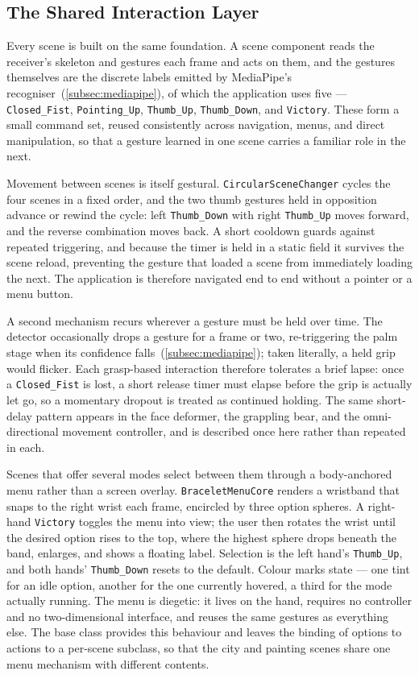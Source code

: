 \subsection{The Shared Interaction Layer}\label{subsec:interaction_layer}

Every scene is built on the same foundation. A scene component reads the
receiver's skeleton and gestures each frame and acts on them, and the gestures
themselves are the discrete labels emitted by MediaPipe's
recogniser~(\autoref{subsec:mediapipe}), of which the application uses five ---
\texttt{Closed\_Fist}, \texttt{Pointing\_Up}, \texttt{Thumb\_Up},
\texttt{Thumb\_Down}, and \texttt{Victory}. These form a small command set, reused
consistently across navigation, menus, and direct manipulation, so that a gesture
learned in one scene carries a familiar role in the next.

Movement between scenes is itself gestural. \texttt{CircularSceneChanger} cycles
the four scenes in a fixed order, and the two thumb gestures held in opposition
advance or rewind the cycle: left \texttt{Thumb\_Down} with right \texttt{Thumb\_Up}
moves forward, and the reverse combination moves back. A short cooldown guards
against repeated triggering, and because the timer is held in a static field it
survives the scene reload, preventing the gesture that loaded a scene from
immediately loading the next. The application is therefore navigated end to end
without a pointer or a menu button.

A second mechanism recurs wherever a gesture must be held over time. The detector
occasionally drops a gesture for a frame or two, re-triggering the palm stage when
its confidence falls~(\autoref{subsec:mediapipe}); taken literally, a held grip
would flicker. Each grasp-based interaction therefore tolerates a brief lapse:
once a \texttt{Closed\_Fist} is lost, a short release timer must elapse before the
grip is actually let go, so a momentary dropout is treated as continued holding.
The same short-delay pattern appears in the face deformer, the grappling bear, and
the omni-directional movement controller, and is described once here rather than
repeated in each.

Scenes that offer several modes select between them through a body-anchored menu
rather than a screen overlay. \texttt{BraceletMenuCore} renders a wristband that
snaps to the right wrist each frame, encircled by three option spheres. A
right-hand \texttt{Victory} toggles the menu into view; the user then rotates the
wrist until the desired option rises to the top, where the highest sphere drops
beneath the band, enlarges, and shows a floating label. Selection is the left
hand's \texttt{Thumb\_Up}, and both hands' \texttt{Thumb\_Down} resets to the
default. Colour marks state --- one tint for an idle option, another for the one
currently hovered, a third for the mode actually running. The menu is diegetic: it
lives on the hand, requires no controller and no two-dimensional interface, and
reuses the same gestures as everything else. The base class provides this
behaviour and leaves the binding of options to actions to a per-scene subclass, so
that the city and painting scenes share one menu mechanism with different contents.

